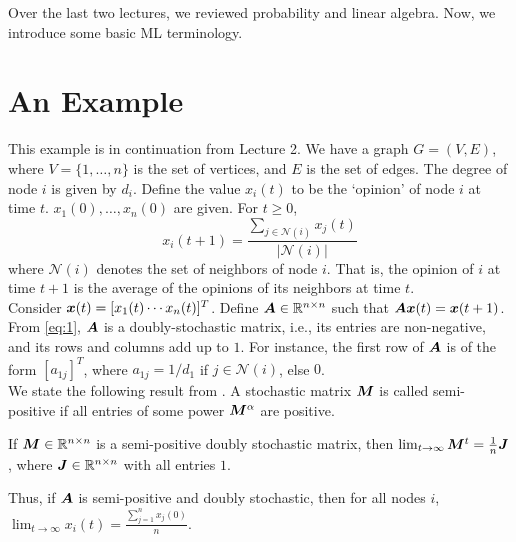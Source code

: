 \documentclass[12pt]{article}
\begin{document}
	\MakeScribeTop


\noindent Over the last two lectures, we reviewed probability and linear algebra. Now, we introduce some basic ML terminology.

\section{An Example}

This example is in continuation from Lecture 2. We have a graph $G = (V,E)$, where $V=\{1,\ldots,n\}$ is the set of vertices, and $E$ is the set of edges. The degree of node $i$ is given by $d_i$. Define the value $x_i(t)$ to be the `opinion' of node $i$ at time $t$. ${x_1(0),\dots,x_n(0)}$ are given. For $t\ge 0$,
\begin{equation} \label{eq:1}
	x_i(t+1) = \frac {\sum_{j\in \mathcal{N}(i)} x_j(t)}{|\mathcal{N}(i)|}
\end{equation}
where $\mathcal{N}(i)$ denotes the set of neighbors of node $i$. That is, the opinion of $i$ at time $t+1$ is the average of the opinions of its neighbors at time $t$.
\\
\noindent Consider ${\boldsymbol x}(t) = [x_1(t) \cdots x_n(t)]^T$. Define ${\boldsymbol A} \in \mathbb{R}^{n\times n}$ such that ${\boldsymbol A}{\boldsymbol x}(t) = {\boldsymbol x}(t+1)$. From \eqref{eq:1}, ${\boldsymbol A}$ is a doubly-stochastic matrix, i.e., its entries are non-negative, and its rows and columns add up to $1$. For instance, the first row of ${\boldsymbol A}$ is of the form $[a_{1j}]^T$, where $a_{1j}=1/d_1$ if $j\in \mathcal{N}(i)$, else $0$.
\\

\noindent We state the following result from \cite{doublystochastic}. A stochastic matrix ${\boldsymbol M}$ is called semi-positive if all entries of some power ${\boldsymbol M}^\alpha$ are positive.
\begin{theorem}
	If ${\boldsymbol M} \in \mathbb{R}^{n\times n}$ is a semi-positive doubly stochastic matrix, then $\lim_{t\to \infty} {\boldsymbol M}^t = \frac{1}{n}{\boldsymbol J}$, where ${\boldsymbol J} \in \mathbb{R}^{n\times n}$ with all entries $1$.
\end{theorem}


\noindent Thus, if ${\boldsymbol A}$ is semi-positive and doubly stochastic, then for all nodes $i$, $\lim_{t\to \infty} x_i(t) = \frac{\sum_{j=1}^{n} x_j(0)}{n}$.
\\
\end{document}
